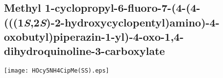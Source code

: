\\[1\baselineskip]
\\[1\baselineskip]
\\[1\baselineskip]


%
%

\subsection{Methyl 1\hyp{}cyclopropyl\hyp{}6\hyp{}fluoro\hyp{}7\hyp{}(4\hyp{}(4\hyp{}(((1\textit{S},2\textit{S})\hyp{}2\hyp{}hydroxycyclopentyl)amino)\hyp{}4\hyp{}oxobutyl)piperazin\hyp{}1\hyp{}yl)\hyp{}4\hyp{}oxo\hyp{}1,4\hyp{}dihydroquinoline\hyp{}3\hyp{}carboxylate }


\begin{scheme}[H]
	\begin{center}
		\texttt{[image: HOcy5NH4CipMe(SS).eps]}
	\end{center}
\end{scheme}

